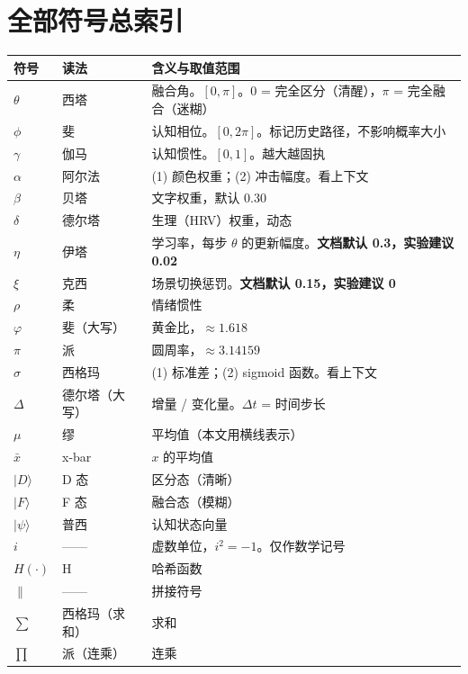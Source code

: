 \documentclass[UTF8,a4paper,11pt]{ctexart}
\begin{document}
\newpage

\section{全部符号总索引}

\begin{longtable}{@{}p{2.3cm}p{2.1cm}p{9.9cm}@{}}
\toprule
\textbf{符号} & \textbf{读法} & \textbf{含义与取值范围} \\
\midrule
\endhead
$\theta$ & 西塔 & 融合角。$[0,\pi]$。0 = 完全区分（清醒），$\pi$ = 完全融合（迷糊） \\
$\phi$ & 斐 & 认知相位。$[0,2\pi]$。标记历史路径，不影响概率大小 \\
$\gamma$ & 伽马 & 认知惯性。$[0,1]$。越大越固执 \\
$\alpha$ & 阿尔法 & (1) 颜色权重；(2) 冲击幅度。看上下文 \\
$\beta$ & 贝塔 & 文字权重，默认 0.30 \\
$\delta$ & 德尔塔 & 生理（HRV）权重，动态 \\
$\eta$ & 伊塔 & 学习率，每步 $\theta$ 的更新幅度。\textbf{文档默认 0.3，实验建议 0.02} \\
$\xi$ & 克西 & 场景切换惩罚。\textbf{文档默认 0.15，实验建议 0} \\
$\rho$ & 柔 & 情绪惯性 \\
$\varphi$ & 斐（大写） & 黄金比，$\approx 1.618$ \\
$\pi$ & 派 & 圆周率，$\approx 3.14159$ \\
$\sigma$ & 西格玛 & (1) 标准差；(2) sigmoid 函数。看上下文 \\
$\Delta$ & 德尔塔（大写） & 增量 / 变化量。$\Delta t$ = 时间步长 \\
$\mu$ & 缪 & 平均值（本文用横线表示） \\
$\bar{x}$ & x-bar & $x$ 的平均值 \\
$|D\rangle$ & D 态 & 区分态（清晰） \\
$|F\rangle$ & F 态 & 融合态（模糊） \\
$|\psi\rangle$ & 普西 & 认知状态向量 \\
$i$ & —— & 虚数单位，$i^2=-1$。仅作数学记号 \\
$H(\cdot)$ & H & 哈希函数 \\
$\|$ & —— & 拼接符号 \\
$\sum$ & 西格玛（求和） & 求和 \\
$\prod$ & 派（连乘） & 连乘 \\

\end{longtable}
\end{document}
